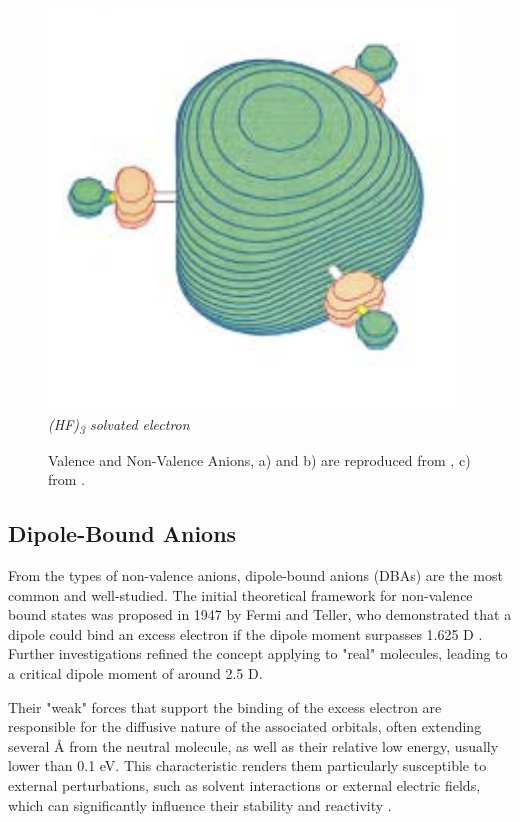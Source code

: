 \begin{figure}[h]
\begin{minipage}[b]{0.27\textwidth}
    \includegraphics[width=\textwidth]{chapters/introduction/image/hf3.png}
    \small\emph{(HF)\textsubscript{3} solvated electron}
  \end{minipage}
  \caption[Valence and Non-Valence Anions]{Valence and Non-Valence Anions, a) and b) are reproduced from \cite{dutta2015electron}, c) from \cite{jordan2003theory}.}
  \label{fig:AnionTypes}
\end{figure}

\subsection{Dipole-Bound Anions}
From the types of non-valence anions, dipole-bound anions (DBAs) are the most common and well-studied. The initial theoretical framework for non-valence bound states was proposed in 1947 by Fermi and Teller, who demonstrated that a dipole could bind an excess electron if the dipole moment surpasses 1.625 D \cite{fermi1947capture}. Further investigations refined the concept applying to "real" molecules, leading to a critical dipole moment of around 2.5 D\cite{jordan2003theory}. 

Their "weak" forces that support the binding of the excess electron are responsible for the diffusive nature of the associated orbitals, often extending several \r{A} from the neutral molecule, as well as their relative low energy, usually lower than 0.1 eV. This characteristic renders them particularly susceptible to external perturbations, such as solvent interactions or external electric fields, which can significantly influence their stability and reactivity \cite{simons2008molecular,herbert2015quantum,jordan2003theory}.

